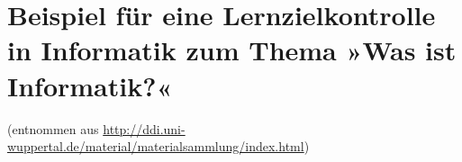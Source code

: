 \documentclass{schullzk}
\newcommand{\materialsammlung}{\url{http://ddi.uni-wuppertal.de/material/materialsammlung/index.html}}
\begin{document}
 \thispagestyle{empty}
 \section*{Beispiel für eine Lernzielkontrolle in
 Informatik zum Thema »Was ist Informatik?«}
 \footnotesize{(entnommen aus \materialsammlung)}
\end{document}
